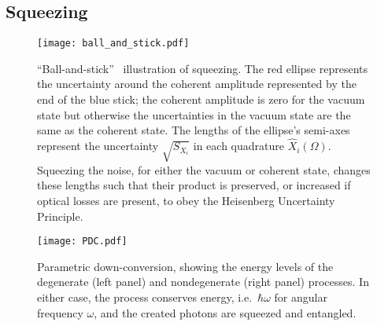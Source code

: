 \subsection{Squeezing}
\label{sec:squeezing_background}

\begin{figure}
	\centering
	\texttt{[image: ball\_and\_stick.pdf]}
	\caption{ ``Ball-and-stick''~\cite{} illustration of squeezing. The red ellipse represents the uncertainty around the coherent amplitude represented by the end of the blue stick; the coherent amplitude is zero for the vacuum state but otherwise the uncertainties in the vacuum state are the same as the coherent state. The lengths of the ellipse's semi-axes represent the uncertainty $\sqrt{S_{X_i}}$ in each quadrature $\hat X_i(\Omega)$. Squeezing the noise, for either the vacuum or coherent state, changes these lengths such that their product is preserved, or increased if optical losses are present, to obey the Heisenberg Uncertainty Principle.}
	\label{fig:ballandstick_simple}
\end{figure}
\begin{figure}
	\centering
	\texttt{[image: PDC.pdf]}
	\caption{Parametric down-conversion, showing the energy levels of the degenerate (left panel) and nondegenerate (right panel) processes. In either case, the process conserves energy, i.e.\ $\hbar\omega$ for angular frequency $\omega$, and the created photons are squeezed and entangled.}
	\label{fig:PDC_deg_and_nondeg}
\end{figure}

